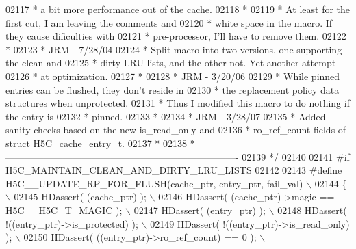 \begin{DoxyCode}
02117 \textcolor{comment}{ *      a bit more performance out of the cache.}
02118 \textcolor{comment}{ *}
02119 \textcolor{comment}{ *      At least for the first cut, I am leaving the comments and}
02120 \textcolor{comment}{ *      white space in the macro.  If they cause dificulties with}
02121 \textcolor{comment}{ *      pre-processor, I'll have to remove them.}
02122 \textcolor{comment}{ *}
02123 \textcolor{comment}{ *      JRM - 7/28/04}
02124 \textcolor{comment}{ *      Split macro into two versions, one supporting the clean and}
02125 \textcolor{comment}{ *      dirty LRU lists, and the other not.  Yet another attempt}
02126 \textcolor{comment}{ *      at optimization.}
02127 \textcolor{comment}{ *}
02128 \textcolor{comment}{ *      JRM - 3/20/06}
02129 \textcolor{comment}{ *      While pinned entries can be flushed, they don't reside in}
02130 \textcolor{comment}{ *      the replacement policy data structures when unprotected.}
02131 \textcolor{comment}{ *      Thus I modified this macro to do nothing if the entry is}
02132 \textcolor{comment}{ *      pinned.}
02133 \textcolor{comment}{ *}
02134 \textcolor{comment}{ *      JRM - 3/28/07}
02135 \textcolor{comment}{ *      Added sanity checks based on the new is\_read\_only and}
02136 \textcolor{comment}{ *      ro\_ref\_count fields of struct H5C\_cache\_entry\_t.}
02137 \textcolor{comment}{ *}
02138 \textcolor{comment}{ *-------------------------------------------------------------------------}
02139 \textcolor{comment}{ */}
02140 
02141 \textcolor{preprocessor}{#if H5C\_MAINTAIN\_CLEAN\_AND\_DIRTY\_LRU\_LISTS}
02142 
02143 \textcolor{preprocessor}{#define H5C\_\_UPDATE\_RP\_FOR\_FLUSH(cache\_ptr, entry\_ptr, fail\_val)            \(\backslash\)}
02144 \textcolor{preprocessor}{\{                                                                           \(\backslash\)}
02145 \textcolor{preprocessor}{    HDassert( (cache\_ptr) );                                                \(\backslash\)}
02146 \textcolor{preprocessor}{    HDassert( (cache\_ptr)->magic == H5C\_\_H5C\_T\_MAGIC );                     \(\backslash\)}
02147 \textcolor{preprocessor}{    HDassert( (entry\_ptr) );                                                \(\backslash\)}
02148 \textcolor{preprocessor}{    HDassert( !((entry\_ptr)->is\_protected) );                               \(\backslash\)}
02149 \textcolor{preprocessor}{    HDassert( !((entry\_ptr)->is\_read\_only) );                               \(\backslash\)}
02150 \textcolor{preprocessor}{    HDassert( ((entry\_ptr)->ro\_ref\_count) == 0 );                           \(\backslash\)}

\end{DoxyCode}
